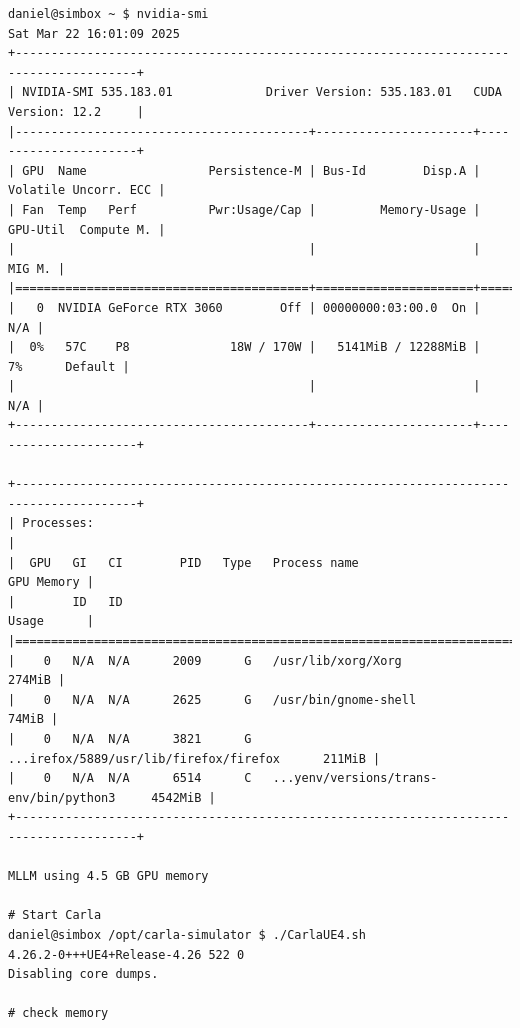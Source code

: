 \begin{verbatim}
daniel@simbox ~ $ nvidia-smi
Sat Mar 22 16:01:09 2025       
+---------------------------------------------------------------------------------------+
| NVIDIA-SMI 535.183.01             Driver Version: 535.183.01   CUDA Version: 12.2     |
|-----------------------------------------+----------------------+----------------------+
| GPU  Name                 Persistence-M | Bus-Id        Disp.A | Volatile Uncorr. ECC |
| Fan  Temp   Perf          Pwr:Usage/Cap |         Memory-Usage | GPU-Util  Compute M. |
|                                         |                      |               MIG M. |
|=========================================+======================+======================|
|   0  NVIDIA GeForce RTX 3060        Off | 00000000:03:00.0  On |                  N/A |
|  0%   57C    P8              18W / 170W |   5141MiB / 12288MiB |      7%      Default |
|                                         |                      |                  N/A |
+-----------------------------------------+----------------------+----------------------+
                                                                                         
+---------------------------------------------------------------------------------------+
| Processes:                                                                            |
|  GPU   GI   CI        PID   Type   Process name                            GPU Memory |
|        ID   ID                                                             Usage      |
|=======================================================================================|
|    0   N/A  N/A      2009      G   /usr/lib/xorg/Xorg                          274MiB |
|    0   N/A  N/A      2625      G   /usr/bin/gnome-shell                         74MiB |
|    0   N/A  N/A      3821      G   ...irefox/5889/usr/lib/firefox/firefox      211MiB |
|    0   N/A  N/A      6514      C   ...yenv/versions/trans-env/bin/python3     4542MiB |
+---------------------------------------------------------------------------------------+

MLLM using 4.5 GB GPU memory

# Start Carla
daniel@simbox /opt/carla-simulator $ ./CarlaUE4.sh 
4.26.2-0+++UE4+Release-4.26 522 0
Disabling core dumps.

# check memory


\end{verbatim}
